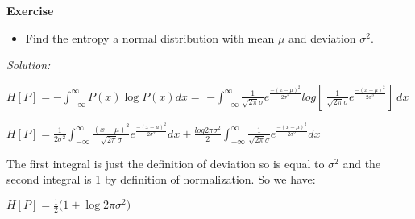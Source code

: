 \documentclass[paper=9in:6in,pagesize=pdftex,headinclude=on,footinclude=on,10pt,bibtotoc,pointlessnumbers,normalheadings,DIV=9,twoside=false]{scrbook}
\begin{document}
\date{}


\begin{large} 
 \textbf{Exercise}
\end{large} 
\begin{itemize} 
\item Find the entropy a normal distribution with mean $\mu$  and deviation $ \sigma ^2$. 
\end{itemize}

\begin{large}
\textit{Solution:\\}
\end{large}

\begin{text}

$H[P]=- \int_{-\infty}^{\infty}P(x) \log{P(x)} dx =$
$-\int_{-\infty}^{\infty} \frac{1}{\sqrt{2\pi}\sigma} e^{\frac{-(x-\mu)^2}{2\sigma^2}} log{[\ \frac{1}{\sqrt{2\pi}\sigma} e^{\frac{-(x-\mu)^2}{2\sigma^2}}]\  }  dx $ 

\end{text}

\begin{text}

$H[P]= \frac{1}{2\sigma^2}\int_{-\infty}^{\infty} \frac{(x-\mu)^2}{\sqrt{2\pi}\sigma} e^{\frac{-(x-\mu)^2}{2\sigma^2}}dx + \frac{log{2\pi}\sigma^2}{2} \int_{-\infty}^{\infty}  \frac{1}{\sqrt{2\pi}\sigma} e^{\frac{-(x-\mu)^2}{2\sigma^2}}dx$ \\
\end{text}

\begin{text}
The first integral is just the definition of deviation so is equal to $\sigma^2$ and the second integral is 1 by definition of normalization. So we have: \\
\end{text}

\begin{text}

$H[P] = \frac{1}{2}(1 + \log{2 \pi \sigma^2)}$

\end{text}
\end{document}
